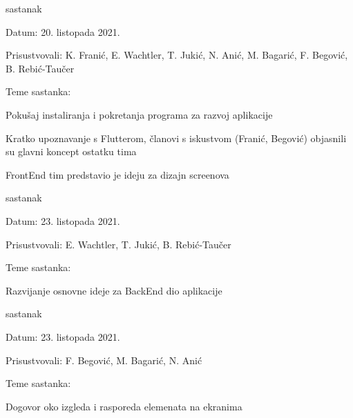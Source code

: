 \begin{packed_enum}
			\item  sastanak
			\item[] \begin{packed_item}
				\item Datum: 20. listopada 2021.
				\item Prisustvovali: K. Franić, E. Wachtler, T. Jukić, N. Anić, M. Bagarić, F. Begović, B. Rebić-Taučer
				\item Teme sastanka:
				\begin{packed_item}
					\item  Pokušaj instaliranja i pokretanja programa za razvoj aplikacije
					\item  Kratko upoznavanje s Flutterom, članovi s iskustvom (Franić, Begović) objasnili su glavni koncept ostatku tima
					\item  FrontEnd tim predstavio je ideju za dizajn screenova
				\end{packed_item}
			\end{packed_item}
		
			\item  sastanak
			\item[] \begin{packed_item}
				\item Datum: 23. listopada 2021.
				\item Prisustvovali: E. Wachtler, T. Jukić, B. Rebić-Taučer
				\item Teme sastanka:
				\begin{packed_item}
					\item  Razvijanje osnovne ideje za BackEnd dio aplikacije
				\end{packed_item}
			\end{packed_item}
		
			\item  sastanak
			\item[] \begin{packed_item}
				\item Datum: 23. listopada 2021.
				\item Prisustvovali: F. Begović, M. Bagarić, N. Anić
				\item Teme sastanka:
				\begin{packed_item}
					\item  Dogovor oko izgleda i rasporeda elemenata na ekranima
				\end{packed_item}
			\end{packed_item}
		

\end{packed_enum}
